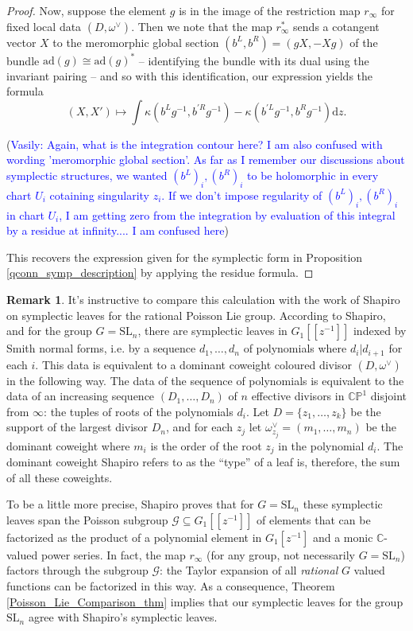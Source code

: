 \documentclass[11pt, oneside, reqno]{amsart}
\theoremstyle{definition} \newtheorem{definition}{Definition}[section]
\theoremstyle{definition} \newtheorem{remark}[definition]{Remark}
\theoremstyle{definition} \newtheorem{remarks}[definition]{Remarks}
\theoremstyle{definition} \newtheorem{question}[definition]{Question}
\theoremstyle{definition} \newtheorem*{note}{Note}
\theoremstyle{definition} \newtheorem{example}[definition]{Example}
\theoremstyle{definition} \newtheorem{examples}[definition]{Examples}
\newcommand{\bb}[1]{\mathbb{#1}}
\newcommand{\mr}[1]{\mathrm{#1}}
\newcommand{\mc}[1]{\mathcal{#1}}
\newcommand{\CC}{\mathbb{C}}
\newcommand{\SL}{\mathrm{SL}}
\newcommand{\sub}{\subseteq}
\newcommand{\iso}{\cong}
\renewcommand{\d}{\mathrm{d}}
\newcommand{\ad}{\mr{ad}}
\newcommand{\vasily}[1]{(\textcolor{blue}{Vasily: #1})}
\begin{document}
\begin{proof}
Now, suppose the element $g$ is in the image of the restriction map $r_\infty$ for fixed local data $(D,\omega^\vee)$.  Then we note that the map $r_\infty^*$ sends a cotangent vector $X$ to the meromorphic global section $(b^L, b^R) = (gX, -Xg)$ of the bundle $\ad(g) \iso \ad(g)^*$ -- identifying the bundle with its dual using the invariant pairing  -- and so with this identification, our expression yields the formula
\[(X,X') \mapsto \int \kappa(b^Lg^{-1}, b^{'R}g^{-1}) - \kappa(b^{'L}g^{-1}, b^{R}g^{-1})\d z.\]

\vasily{Again, what is the integration contour here? I am also confused
  with wording 'meromorphic global section'. As far as I remember our discussions about symplectic structures, we wanted $(b^L)_{i}, (b^R)_{i}$ to be 
  holomorphic in every chart $U_i$ cotaining singularity $z_i$.
  If we don't impose regularity of $(b^L)_i, (b^R)_i$ in chart $U_i$,
   I am getting zero from the integration by evaluation
of this integral by a residue at infinity.... I am confused here} 

This recovers the expression given for the symplectic form in Proposition \ref{qconn_symp_description} by applying the residue formula.
\end{proof}

\begin{remark} \label{shapiro_leaves_remark}
It's instructive to compare this calculation with the work of Shapiro \cite{Shapiro} on symplectic leaves for the rational Poisson Lie group.  According to Shapiro, and for the group $G = \SL_n$, there are symplectic leaves in $G_1[[z^{-1}]]$ indexed by Smith normal forms, i.e. by a sequence $d_1, \ldots, d_n$ of polynomials where $d_i | d_{i+1}$ for each $i$.  This data is equivalent to a dominant coweight coloured divisor $(D,\omega^\vee)$ in the following way.  The data of the sequence of polynomials is equivalent to the data of an increasing sequence $(D_1, \ldots, D_n)$ of $n$ effective divisors in $\bb{CP}^1$ disjoint from $\infty$: the tuples of roots of the polynomials $d_i$.  Let $D = \{z_1, \ldots, z_k\}$ be the support of the largest divisor $D_n$, and for each $z_j$ let $\omega^\vee_{z_j} = (m_1, \ldots, m_n)$ be the dominant coweight where $m_i$ is the order of the root $z_j$ in the polynomial $d_i$.  The dominant coweight Shapiro refers to as the ``type'' of a leaf is, therefore, the sum of all these coweights.

To be a little more precise, Shapiro proves that for $G = \SL_n$ these symplectic leaves span the Poisson subgroup $\mc G \sub G_1[[z^{-1}]]$ of elements that can be factorized as the product of a polynomial element in $G_1[z^{-1}]$ and a monic $\CC$-valued power series.  In fact, the map $r_\infty$ (for any group, not necessarily $G = \SL_n$) factors through the subgroup $\mc G$: the Taylor expansion of all \emph{rational} $G$ valued functions can be factorized in this way.  As a consequence, Theorem \ref{Poisson_Lie_Comparison_thm} implies that our symplectic leaves for the group $\SL_n$ agree with Shapiro's symplectic leaves.
\end{remark}
\end{document}
